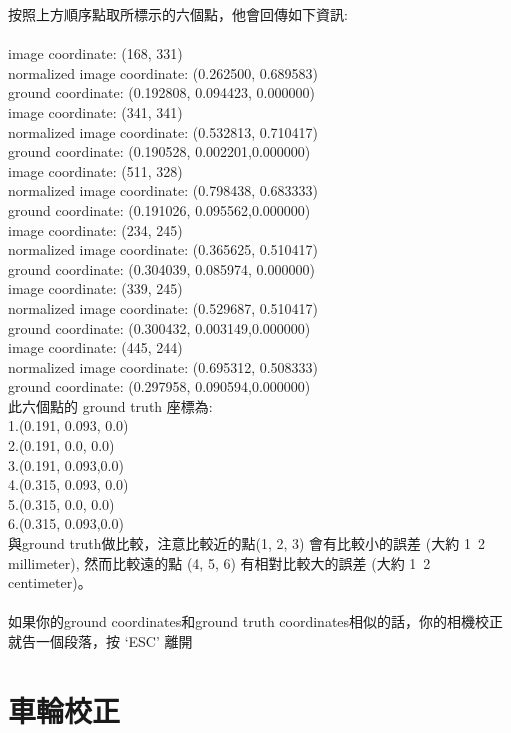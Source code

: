 \documentclass{article}
\begin{document}
按照上方順序點取所標示的六個點，他會回傳如下資訊:
\\
\\image coordinate: (168, 331)
\\normalized image coordinate: (0.262500, 0.689583)
\\ground coordinate: (0.192808, 0.094423, 0.000000)
\\image coordinate: (341, 341)
\\normalized image coordinate: (0.532813, 0.710417)
\\ground coordinate: (0.190528, 0.002201,0.000000)
\\image coordinate: (511, 328)
\\normalized image coordinate: (0.798438, 0.683333)
\\ground coordinate: (0.191026, 0.095562,0.000000)
\\image coordinate: (234, 245)
\\normalized image coordinate: (0.365625, 0.510417)
\\ground coordinate: (0.304039, 0.085974, 0.000000)
\\image coordinate: (339, 245)
\\normalized image coordinate: (0.529687, 0.510417)
\\ground coordinate: (0.300432, 0.003149,0.000000)
\\image coordinate: (445, 244)
\\normalized image coordinate: (0.695312, 0.508333)
\\ground coordinate: (0.297958, 0.090594,0.000000)
\\此六個點的 ground truth 座標為:
\\1.(0.191, 0.093, 0.0)
\\2.(0.191, 0.0, 0.0)
\\3.(0.191, 0.093,0.0)
\\4.(0.315, 0.093, 0.0)
\\5.(0.315, 0.0, 0.0)
\\6.(0.315, 0.093,0.0)
\\與ground truth做比較，注意比較近的點(1, 2, 3) 會有比較小的誤差 (大約 1~2 millimeter), 然而比較遠的點 (4, 5, 6) 有相對比較大的誤差 (大約 1~2 centimeter)。
\\
\\如果你的ground coordinates和ground truth coordinates相似的話，你的相機校正就告一個段落，按 ‘ESC’ 離開

\section{車輪校正}
\end{document}
